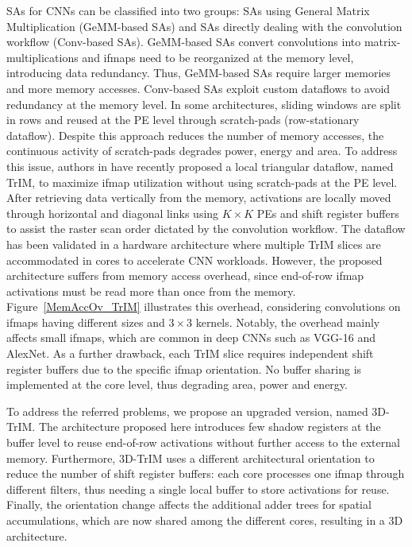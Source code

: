 
SAs for CNNs can be classified into two groups: SAs using General Matrix Multiplication (GeMM-based SAs) and SAs directly dealing with the convolution workflow (Conv-based SAs). GeMM-based SAs\cite{Jouppi_17, Fornt_23, Wu_24, Feng_24} convert convolutions into matrix-multiplications and ifmaps need to be reorganized at the memory level, introducing data redundancy. Thus, GeMM-based SAs require larger memories and more memory accesses. Conv-based SAs\cite{Chen_17,Zhang_24,Sestito_24_1,Sestito_24_2} exploit custom dataflows to avoid redundancy at the memory level. In some architectures\cite{Chen_17,Zhang_24}, sliding windows are split in rows and reused at the PE level through scratch-pads (row-stationary dataflow\cite{Chen_16}). Despite this approach reduces the number of memory accesses, the continuous activity of scratch-pads degrades power, energy and area. To address this issue, authors in\cite{Sestito_24_1,Sestito_24_2} have recently proposed a local triangular dataflow, named TrIM, to maximize ifmap utilization without using scratch-pads at the PE level. After retrieving data vertically from the memory, activations are locally moved through horizontal and diagonal links using $K \times K$ PEs and shift register buffers to assist the raster scan order dictated by the convolution workflow. The dataflow has been validated in a hardware architecture where multiple TrIM slices are accommodated in cores to accelerate CNN workloads. However, the proposed architecture suffers from memory access overhead, since end-of-row ifmap activations must be read more than once from the memory. Figure~\ref{MemAccOv_TrIM} illustrates this overhead, considering convolutions on ifmaps having different sizes and $3 \times 3$ kernels. Notably, the overhead mainly affects small ifmaps, which are common in deep CNNs such as VGG-16\cite{Simonyan_15} and AlexNet\cite{Krizhevsky_12}. As a further drawback, each TrIM slice\cite{Sestito_24_2} requires independent shift register buffers due to the specific ifmap orientation. No buffer sharing is implemented at the core level, thus degrading area, power and energy.

To address the referred problems, we propose an upgraded version, named 3D-TrIM. The architecture proposed here introduces few shadow registers at the buffer level to reuse end-of-row activations without further access to the external memory. Furthermore, 3D-TrIM uses a different architectural orientation to reduce the number of shift register buffers: each core processes one ifmap through different filters, thus needing a single local buffer to store activations for reuse. Finally, the orientation change affects the additional adder trees for spatial accumulations, which are now shared among the different cores, resulting in a 3D architecture. 

